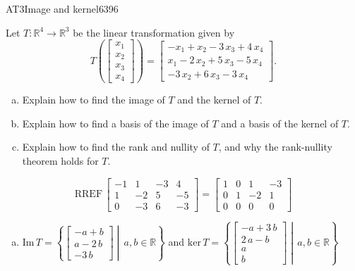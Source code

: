 \begin{exercise}{AT3}{Image and kernel}{6396} 
\begin{exerciseStatement} 

 Let \(T:\mathbb{R}^4 \to \mathbb{R}^3\) be the linear transformation given by \[T\left( \left[\begin{array}{c}
x_{1} \\
x_{2} \\
x_{3} \\
x_{4}
\end{array}\right] \right) = \left[\begin{array}{c}
-x_{1} + x_{2} - 3 \, x_{3} + 4 \, x_{4} \\
x_{1} - 2 \, x_{2} + 5 \, x_{3} - 5 \, x_{4} \\
-3 \, x_{2} + 6 \, x_{3} - 3 \, x_{4}
\end{array}\right].\] 

 

\begin{enumerate}[(a)]
\item Explain how to find the image of \(T\) and the kernel of \(T\).
\item Explain how to find a basis of the image of \(T\) and a basis of the kernel of \(T\).
\item Explain how to find the rank and nullity of \(T\), and why the rank-nullity theorem holds for \(T\).
\end{enumerate}

     \end{exerciseStatement}
 \begin{exerciseAnswer} 

\[\mathrm{RREF}\,\left[\begin{array}{cccc}
-1 & 1 & -3 & 4 \\
1 & -2 & 5 & -5 \\
0 & -3 & 6 & -3
\end{array}\right]=\left[\begin{array}{cccc}
1 & 0 & 1 & -3 \\
0 & 1 & -2 & 1 \\
0 & 0 & 0 & 0
\end{array}\right]\]

 

\begin{enumerate}[(a)]
\item  

 \(\mathrm{Im}\,T =  \left\{ \left[\begin{array}{c}
-a + b \\
a - 2 \, b \\
-3 \, b
\end{array}\right] \middle|\,a,b\in\mathbb{R}\right\}\) and \(\mathrm{ker}\,T = \left\{ \left[\begin{array}{c}
-a + 3 \, b \\
2 \, a - b \\
a \\
b
\end{array}\right] \middle|\,a,b\in\mathbb{R}\right\}\) 


\end{enumerate}
\end{exerciseAnswer}
\end{exercise}
